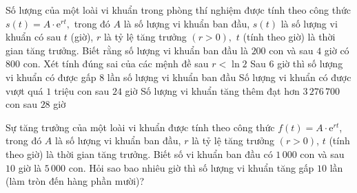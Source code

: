 \begin{ex}%
	Số lượng của một loài vi khuẩn trong phòng thí nghiệm được tính theo công thức $s(t)=A\cdot\mathrm{e}^{rt},$ trong đó $A$ là số lượng vi khuẩn ban đầu, $s(t)$ là số lượng vi khuẩn có sau $t$ (giờ), $r$ là tỷ lệ tăng trưởng $\left(r>0\right),$ $t$ (tính theo giờ) là thời gian tăng trưởng. Biết rằng số lượng vi khuẩn ban đầu là $200$ con và sau $4$ giờ có $800$ con. Xét tính đúng sai của các mệnh đề sau
	\choiceTF
	{\True $r<\ln2$}
	{\True Sau $6$ giờ thì số lượng vi khuẩn có được gấp $8$ lần số lượng vi khuẩn ban đầu}
	{Số lượng vi khuẩn có được vượt quá $1$ triệu con sau $24$ giờ}
	{Số lượng vi khuẩn tăng thêm đạt hơn $3\,276\,700$ con sau $28$ giờ}
\end{ex}

\begin{ex}%
	Sự tăng trưởng của một loài vi khuẩn được tính theo công thức $f(t)=A\cdot \mathrm{e}^{rt}$, trong đó $A$ là số lượng vi khuẩn ban đầu, $r$ là tỷ lệ tăng trưởng $(r>0)$, $t$ (tính theo giờ) là thời gian tăng trưởng. Biết số vi khuẩn ban đầu có $1\,000$ con và sau $10$ giờ là $5\,000$ con. Hỏi sao bao nhiêu giờ thì số lượng vi khuẩn tăng gấp $10$ lần (làm tròn đến hàng phần mười)?
\end{ex}


